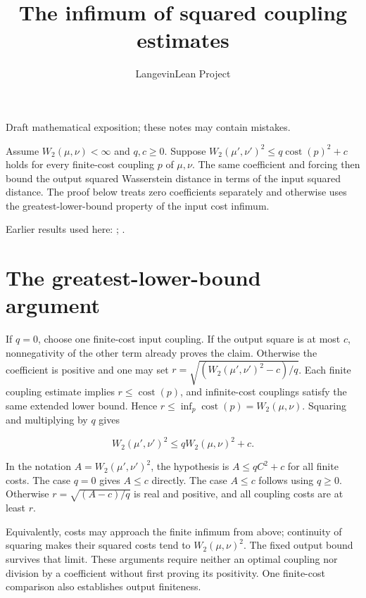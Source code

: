 \documentclass[11pt,a4paper]{article}
\title{\texorpdfstring{The infimum of squared coupling estimates}{The infimum of squared coupling estimates}}
\author{LangevinLean Project}
\date{}
\begin{document}
\maketitle
Draft mathematical exposition; these notes may contain mistakes.


Assume \(W_2(\mu,\nu)<\infty\) and \(q,c\ge0\). Suppose \(W_2(\mu',\nu')^2\le q\operatorname{cost}(p)^2+c\) holds for every finite-cost coupling \(p\) of \(\mu,\nu\). The same coefficient and forcing then bound the output squared Wasserstein distance in terms of the input squared distance. The proof below treats zero coefficients separately and otherwise uses the greatest-lower-bound property of the input cost infimum.



Earlier results used here: \cite[Section~3.18]{LangevinLean2026ULASC}; \cite[Section~3.33]{LangevinLean2026ULASC}.

\section{\texorpdfstring{The greatest-lower-bound argument}{The greatest-lower-bound argument}}


If \(q=0\), choose one finite-cost input coupling. If the output square is at most \(c\), nonnegativity of the other term already proves the claim. Otherwise the coefficient is positive and one may set \(r=\sqrt{(W_2(\mu',\nu')^2-c)/q}\). Each finite coupling estimate implies \(r\le\operatorname{cost}(p)\), and infinite-cost couplings satisfy the same extended lower bound. Hence \(r\le\inf_p\operatorname{cost}(p)=W_2(\mu,\nu)\). Squaring and multiplying by \(q\) gives

\[W_2(\mu',\nu')^2\le qW_2(\mu,\nu)^2+c.\]

In the notation \(A=W_2(\mu',\nu')^2\), the hypothesis is \(A\le qC^2+c\) for all finite costs. The case \(q=0\) gives \(A\le c\) directly. The case \(A\le c\) follows using \(q\ge0\). Otherwise \(r=\sqrt{(A-c)/q}\) is real and positive, and all coupling costs are at least \(r\).



Equivalently, costs may approach the finite infimum from above; continuity of squaring makes their squared costs tend to \(W_2(\mu,\nu)^2\). The fixed output bound survives that limit. These arguments require neither an optimal coupling nor division by a coefficient without first proving its positivity. One finite-cost comparison also establishes output finiteness.
\end{document}
